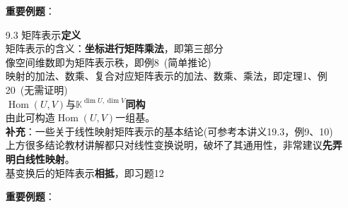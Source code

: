 \documentclass[a4paper,UTF8,fontset=windows,AutoFakeBold]{ctexart}
\DeclareMathOperator{\Hom}{Hom}
\newcommand*{\note}{\noindent *}
\begin{document}
\begin{enumerate}
    \textbf{重要例题}：

    \item[9.3] 矩阵表示\textbf{定义}
    \\矩阵表示的含义：\textbf{坐标进行矩阵乘法}，即第三部分
    \\像空间维数即为矩阵表示秩，即例8\ (简单推论)
    \\映射的加法、数乘、复合对应矩阵表示的加法、数乘、乘法，即定理1、例20\ (无需证明)
    \\$\Hom(U,V)$与$\mathbb{K}^{\dim U,\dim V}$\textbf{同构}
    \\\note 由此可构造$\Hom(U,V)$一组基。
    \\\textbf{补充}：一些关于线性映射矩阵表示的基本结论(可参考本讲义19.3，例9、10)
    \\\note 上方很多结论教材讲解都只对线性变换说明，破坏了其通用性，非常建议\textbf{先弄明白线性映射}。
    \\基变换后的矩阵表示\textbf{相抵}，即习题12

    \textbf{重要例题}：
\end{enumerate}
\end{document}
